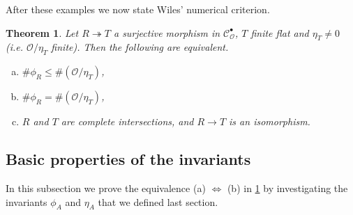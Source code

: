 \documentclass{article}
\theoremstyle{plain}%
\newtheorem{theorem}{Theorem}[section]
\theoremstyle{definition}
\theoremstyle{remark}
\newcommand{\cob}{\mathcal{C}_\mathcal{O}^\bullet}
\begin{document}
After these examples we now state Wiles' numerical criterion.
\begin{theorem}\textup{\cite[theorem 5.3]{Darmon1995}}\label{thm:wiles_numerical_criterion}
    Let \(R \twoheadrightarrow T\) a surjective morphism in \(\cob\), \(T\) finite flat and \(\eta_T \neq 0\) 
    (i.e. \(\mathcal{O}/\eta_T\) finite).
    Then the following are equivalent.
    \begin{enumerate}[(a)]
        \item \(\# \phi_R \le \#(\mathcal{O}/\eta_T)\),
        \item \(\# \phi_R = \#(\mathcal{O}/\eta_T)\),
        \item \(R\) and \(T\) are complete intersections, and \(R \to T\) is an isomorphism.
    \end{enumerate}
\end{theorem}

\subsection{Basic properties of the invariants}
In this subsection we prove the equivalence (a) \(\Leftrightarrow\) (b) in \cref{thm:wiles_numerical_criterion}
by investigating the invariants \(\phi_A\) and \(\eta_A\) that we defined last section.
\end{document}
